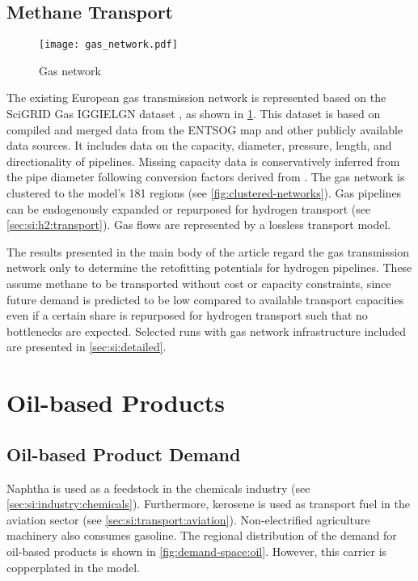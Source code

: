 \subsection{Methane Transport}
\label{sec:si:methane:transport}

\begin{figure}
    \texttt{[image: gas\_network.pdf]}
    \label{fig:gas-raw}
    \caption{Gas network}
\end{figure}

The existing European gas transmission network is represented based on the
SciGRID Gas IGGIELGN dataset , as shown in
\cref{fig:gas-raw}. This dataset is based on compiled and merged data from the
ENTSOG map \citeS{} and other publicly available data sources. It includes data
on the capacity, diameter, pressure, length, and directionality of pipelines.
Missing capacity data is conservatively inferred from the pipe diameter
following conversion factors derived from . The gas
network is clustered to the model's 181 regions (see
\cref{fig:clustered-networks}). Gas pipelines can be endogenously expanded or
repurposed for hydrogen transport (see \cref{sec:si:h2:transport}). Gas flows
are represented by a lossless transport model.

The results presented in the main body of the article regard the gas
transmission network only to determine the retofitting potentials for hydrogen
pipelines. These assume methane to be transported without cost or capacity
constraints, since future demand is predicted to be low compared to available
transport capacities even if a certain share is repurposed for hydrogen
transport such that no bottlenecks are expected. Selected runs with gas network
infrastructure included are presented in \cref{sec:si:detailed}.

\section{Oil-based Products}
\label{sec:si:oil}

\subsection{Oil-based Product Demand}
\label{sec:si:demand}

Naphtha is used as a feedstock in the chemicals industry (see
\cref{sec:si:industry:chemicals}). Furthermore, kerosene is used as transport
fuel in the aviation sector (see \cref{sec:si:transport:aviation}).
Non-electrified agriculture machinery also consumes gasoline. The regional
distribution of the demand for oil-based products is shown in
\cref{fig:demand-space:oil}. However, this carrier is copperplated in the model.

